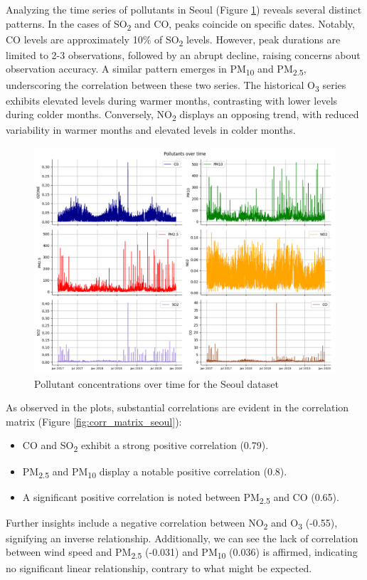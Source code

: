 Analyzing the time series of pollutants in Seoul (Figure \ref{fig:ts_seoul}) reveals several distinct patterns. In the cases of SO\textsubscript{2} and CO, peaks coincide on specific dates. Notably, CO levels are approximately 10\% of SO\textsubscript{2} levels. However, peak durations are limited to 2-3 observations, followed by an abrupt decline, raising concerns about observation accuracy. 
A similar pattern emerges in PM\textsubscript{10} and PM\textsubscript{2.5}, underscoring the correlation between these two series. The historical O\textsubscript{3} series exhibits elevated levels during warmer months, contrasting with lower levels during colder months.
Conversely, NO\textsubscript{2} displays an opposing trend, with reduced variability in warmer months and elevated levels in colder months. 

\begin{figure}[h]
    \centering
    \includegraphics[width=1\linewidth]{images/ts_seoul.png}
    \caption{Pollutant concentrations over time for the Seoul dataset}
    \label{fig:ts_seoul}
\end{figure}


As observed in the plots, substantial correlations are evident in the correlation matrix (Figure \ref{fig:corr_matrix_seoul}):

\begin{itemize}
    \item CO and SO\textsubscript{2} exhibit a strong positive correlation (0.79).
    \item PM\textsubscript{2.5} and PM\textsubscript{10} display a notable positive correlation (0.8).
    \item A significant positive correlation is noted between PM\textsubscript{2.5} and CO (0.65).
\end{itemize}
Further insights include a negative correlation between NO\textsubscript{2} and O\textsubscript{3} (-0.55), signifying an inverse relationship. Additionally, we can see the lack of correlation between wind speed and PM\textsubscript{2.5} (-0.031) and PM\textsubscript{10} (0.036) is affirmed, indicating no significant linear relationship, contrary to what might be expected.

